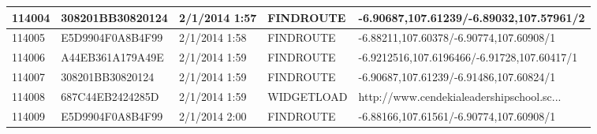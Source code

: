 \begin{longtable}{|p{1cm}|l|l|l|p{8cm}|}
114004         & 308201BB30820124 & 2/1/2014 1:57            & FINDROUTE       & -6.90687,107.61239/-6.89032,107.57961/2                                                                                                                                                                               \\ \hline
114005         & E5D9904F0A8B4F99 & 2/1/2014 1:58            & FINDROUTE       & -6.88211,107.60378/-6.90774,107.60908/1                                                                                                                                                                               \\ \hline
114006         & A44EB361A179A49E & 2/1/2014 1:59            & FINDROUTE       & -6.9212516,107.6196466/-6.91728,107.60417/1                                                                                                                                                                           \\ \hline
114007         & 308201BB30820124 & 2/1/2014 1:59            & FINDROUTE       & -6.90687,107.61239/-6.91486,107.60824/1                                                                                                                                                                               \\ \hline
114008         & 687C44EB2424285D & 2/1/2014 1:59            & WIDGETLOAD      & http://www.cendekialeadershipschool.sc...
				 \\ \hline
114009         & E5D9904F0A8B4F99 & 2/1/2014 2:00            & FINDROUTE       & -6.88166,107.61561/-6.90774,107.60908/1                                                                                                                                                                               \\ \hline
\end{longtable}